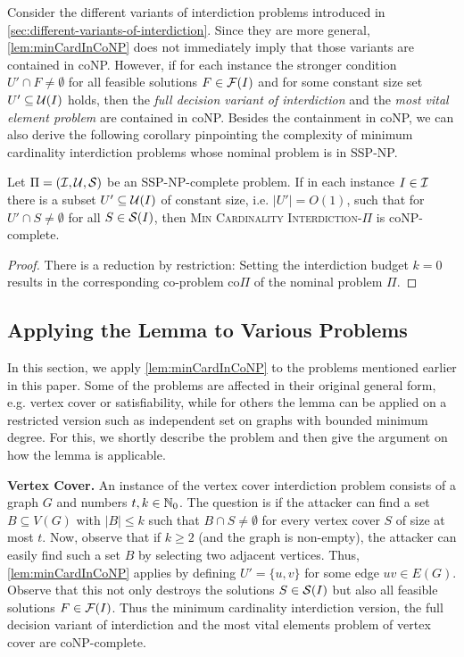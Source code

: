 Consider the different variants of interdiction problems introduced in \cref{sec:different-variants-of-interdiction}.
Since they are more general, \cref{lem:minCardInCoNP} does not immediately imply that those variants are contained in coNP.
However, if for each instance the stronger condition $U' \cap F \neq \emptyset$ for all feasible solutions $F \in \mathcal{F}(I)$ and for some constant size set $U' \subseteq \mathcal{U}(I)$ holds, then the \emph{full decision variant of interdiction} and the \emph{most vital element problem} are contained in coNP.
Besides the containment in coNP, we can also derive the following corollary pinpointing the complexity of minimum cardinality interdiction problems whose nominal problem is in SSP-NP.

\begin{corollary}
    Let $\Pi = (\mathcal{I}, \mathcal{U}, \mathcal{S})$ be an SSP-NP-complete problem.
    If in each instance $I \in \mathcal{I}$ there is a subset $U' \subseteq \mathcal{U}(I)$ of constant size, i.e. $|U'| = O(1)$, such that for $U' \cap S \neq \emptyset$ for all $S \in \mathcal{S}(I)$, then \textsc{Min Cardinality Interdiction-$\Pi$} is coNP-complete.
\end{corollary}
\begin{proof}
    There is a reduction by restriction:
    Setting the interdiction budget $k = 0$ results in the corresponding co-problem co$\Pi$ of the nominal problem $\Pi$.
\end{proof}

\subsection{Applying the Lemma to Various Problems}

In this section, we apply \cref{lem:minCardInCoNP} to the problems mentioned earlier in this paper.
Some of the problems are affected in their original general form, e.g. vertex cover or satisfiability, while for others the lemma can be applied on a restricted version such as independent set on graphs with bounded minimum degree.
For this, we shortly describe the problem and then give the argument on how the lemma is applicable.

\textbf{Vertex Cover.}
An instance of the vertex cover interdiction problem consists of a graph $G$ and numbers $t,k \in \mathbb{N}_0$.
The question is if the attacker can find a set $B \subseteq V(G)$ with $|B| \leq k$ such that $B \cap S \neq \emptyset$ for every vertex cover $S$ of size at most $t$.
Now, observe that if $k \geq 2$ (and the graph is non-empty), the attacker can easily find such a set $B$ by selecting two adjacent vertices.
Thus, \cref{lem:minCardInCoNP} applies by defining $U' = \{u, v\}$ for some edge $uv \in E(G)$.
Observe that this not only destroys the solutions $S \in \mathcal{S}(I)$ but also all feasible solutions $F \in \mathcal{F}(I)$.
Thus the minimum cardinality interdiction version, the full decision variant of interdiction and the most vital elements problem of vertex cover are coNP-complete.


